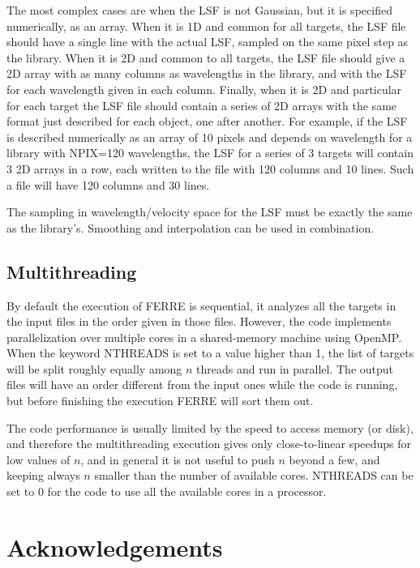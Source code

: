 \documentclass[12pt]{article}
\begin{document}
The most complex cases are when the LSF is not Gaussian, but it is specified numerically,
as an array. When it is 1D and common for all targets, the LSF file should have a single
line with the actual LSF, sampled on the same pixel step as the library. When it is 2D and
common to all targets, the LSF file should give a 2D array with as many columns as wavelengths
in the library, and with the LSF for each wavelength given in each column. Finally, when
it is 2D and particular for each target the LSF file should contain a series of 2D arrays
with the same format just described for each object, one after another. For example, if the
LSF is described numerically as an array of 10 pixels and depends on wavelength for
a library with NPIX=120 wavelengths, the LSF for a series of 3 targets will contain 3
2D arrays in a row, each written to the file with 120 columns and 10 lines. Such a file
will have 120 columns and 30 lines.

The sampling in wavelength/velocity space for the LSF must be exactly the same as 
the library's. Smoothing and interpolation can be used in combination.

\subsection{Multithreading}

By default the execution of FERRE is sequential, it analyzes all the targets in 
the input files in the order given in those files. However, the code implements 
parallelization over multiple cores in a shared-memory machine using OpenMP.
When the keyword NTHREADS is set to a value higher than 1, the list of targets
will be split roughly equally among $n$ threads and run in parallel. The output
files will have an order different from the input ones while the code is running,
but before finishing the execution FERRE will sort them out.

The code performance is usually limited by the speed to access memory (or disk),
and therefore the multithreading execution gives only close-to-linear speedups 
for low values of $n$, and in general it is not useful to push $n$ beyond a few,
and keeping always $n$ smaller than the number of available cores. NTHREADS can
be set to 0 for the code to use all the available cores in a processor.

\section{Acknowledgements}
\end{document}
